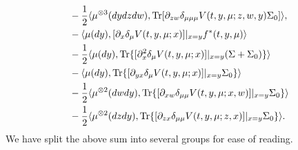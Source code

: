 \documentclass{amsart}
\theoremstyle{definition}
\theoremstyle{remark}
\def\D{\partial}
\numberwithin{equation}{section}
\begin{document}
{\begin{align*}
&-\frac{1}{2}\langle\mu^{\otimes3}(dydzdw), {\rm Tr}[\D_{zw}\delta_{\mu\mu\mu} V (t, y, \mu; z,w,y)
\Sigma_0]\rangle ,\notag\\
&-\langle\mu(dy), [\D_x\delta_\mu V(t,y, \mu; x)]|_{x=y} f^*(t, y,\mu)\rangle \\
& - \frac{1}{2}\langle\mu(dy), {\rm Tr}\{[
\D_{x}^2 \delta_\mu
V(t, y, \mu; x)]|_{x=y} (\Sigma+\Sigma_0)\}\rangle \\
&-\langle\mu(dy),  {\rm Tr}\{ [ \D_{yx}\delta_\mu V(t,y, \mu;x)]|_{x=y}  \Sigma_0 \}\rangle  \\
& - \frac{1}{2}\langle\mu^{\otimes2}(dwdy), {\rm Tr}\{[\D_{xw}\delta_{\mu\mu} V (t, y, \mu; x,w)]|_{x=y}
\Sigma_0\}\rangle\\
& - \frac{1}{2}\langle\mu^{\otimes2}(dzdy), {\rm Tr}\{[\D_{zx}\delta_{\mu\mu} V (t, y, \mu; z,x)]|_{x=y}
\Sigma_0\}\rangle.
\end{align*}}
We have split the above sum into several groups for ease of reading.
\end{document}
